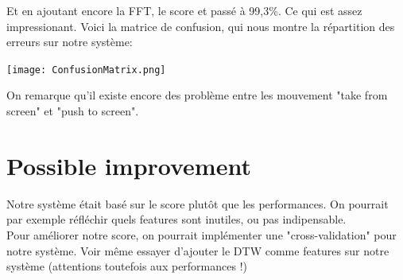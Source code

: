 Et en ajoutant encore la FFT, le score et passé à 99,3\%. Ce qui est assez impressionant. Voici la matrice de confusion, qui nous montre la répartition des erreurs sur notre système:
\begin{center} 
\hspace{15cm}
\texttt{[image: ConfusionMatrix.png]}
\end{center}
\vspace{0.5cm} 

On remarque qu'il existe encore des problème entre les mouvement "take from screen" et "push to screen". 

\section{Possible improvement}

Notre système était basé sur le score plutôt que les performances. On pourrait par exemple réfléchir quels features sont inutiles, ou pas indipensable. \\

Pour améliorer notre score, on pourrait implémenter une "cross-validation" pour notre système. Voir même essayer d'ajouter le DTW comme features sur notre système (attentions toutefois aux performances !)
